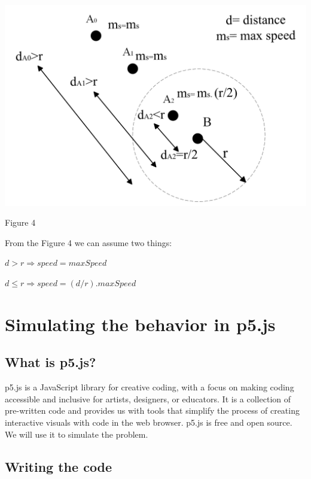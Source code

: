 \documentclass[10pt,twoside,english,a4paper]{article}
\begin{document}
\includegraphics[scale=0.25]{diagram_radius.png}\par
Figure 4
\bigbreak


From the Figure 4 we can assume two things: 

\begin{center}

$d>r 	\Rightarrow speed = maxSpeed$ \par

$d \leq r \Rightarrow speed = (d/r)  . maxSpeed$

\end{center}		


\section{Simulating the behavior in p5.js} \label{simulation} 

\subsection{What is p5.js?} \label{p5 char} 

p5.js is a JavaScript library for creative coding, with a focus on making coding accessible and inclusive for artists, designers, or educators. It is a collection of pre-written code and provides us with tools that simplify the process of creating interactive visuals with code in the web browser. p5.js is free and open source. We will use it to simulate the problem. 

\subsection{Writing the code } \label{code} 
\end{document}
